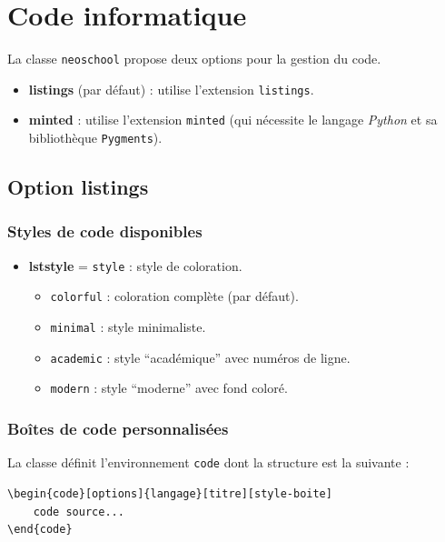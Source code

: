 \documentclass[
    french,
    margin=2cm
]{neoschool}
\begin{document}
\section{Code informatique}

La classe \texttt{neoschool} propose deux options pour la
gestion du code.

\begin{itemize}
\item \textbf{listings} (par défaut) : utilise l'extension \texttt{listings}.
\item \textbf{minted} : utilise l'extension \texttt{minted} (qui nécessite le langage \textit{Python} et sa bibliothèque
  \texttt{Pygments}).
\end{itemize}

\subsection{Option listings}

\subsubsection{Styles de code disponibles}

\begin{itemize}
\item \textbf{lststyle} = \texttt{style} : style de
  coloration.
  \begin{itemize}
  \item \texttt{colorful} : coloration complète (par défaut).
  \item \texttt{minimal} : style minimaliste.
  \item \texttt{academic} : style ``académique'' avec numéros de ligne.
  \item \texttt{modern} : style ``moderne'' avec fond coloré.
  \end{itemize}
\end{itemize}

\subsubsection{Boîtes de code personnalisées}

La classe définit l'environnement \texttt{code} dont la structure est la suivante :

\begin{lstlisting}[style=latex]
\begin{code}[options]{langage}[titre][style-boite]
    code source...
\end{code}
\end{lstlisting}
\end{document}
